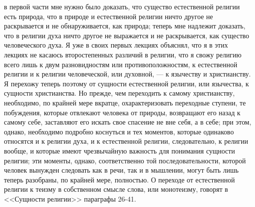 \documentclass[12pt]{article}
\begin{document}
в первой части мне нужно было доказать, что существо естественной религии есть природа, что в природе и естественной религии ничто другое не раскрывается и не обнаруживается, как природа; теперь мне надлежит доказать, что в религии духа ничто другое не выражается и не раскрывается, как существо человеческого духа. Я уже в своих первых лекциях объяснял, что я в этих лекциях не касаюсь второстепенных различий в религии, что я свожу религию всего лишь к двум разновидностям или противоположностям, к естественной религии и к религии человеческой, или духовной, --- к язычеству и христианству. Я перехожу теперь поэтому от сущности естественной религии, или язычества, к сущности христианства. Но прежде, чем переходить к самому христианству, необходимо, по крайней мере вкратце, охарактеризовать переходные ступени, те побуждения, которые отвлекают человека от природы, возвращают его назад к самому себе, заставляют его искать свое спасение не вне себя, а в себе; при этом, однако, необходимо подробно коснуться и тех моментов, которые одинаково относятся и к религии духа, и к естественной религии, следовательно, к религии вообще, и которые имеют чрезвычайную важность для понимания сущности религии; эти моменты, однако, соответственно той последовательности, которой человек вынужден следовать как в речи, так и в мышлении, могут быть лишь теперь разобраны, по крайней мере, полностью. О переходе от естественной религии к теизму в собственном смысле слова, или монотеизму, говорят в <<Сущности религии>> параграфы 26-41. 
\end{document}
